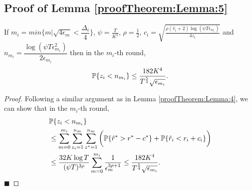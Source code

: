 \subsection{Proof of Lemma \ref{proofTheorem:Lemma:5}}
\label{App:Lemma:5}
\begin{customlem}{5}
If $m_i = min\lbrace m|\sqrt{4\epsilon_{m} } < \dfrac{\Delta_i}{4} \rbrace $, $\psi=\frac{T}{ K^2}$, $\rho=\frac{1}{2}$, $c_{i} =\sqrt{\frac{\rho (\hat{v}_i + 2)\log (\psi T\epsilon_{m_{i}})}{4 z_i}}$ and $n_{m_i}=\dfrac{\log{(\psi T\epsilon_{m_{i}}^{2})}}{2\epsilon_{m_{i}}}$ then in the $m_i$-th round, 
\begin{align*}
\mathbb{P}\lbrace z_i < n_{m_i} \rbrace \leq \dfrac{182 K^4}{T^{\frac{5}{4}}\sqrt{\epsilon_{m_i}}}.
\end{align*}
\end{customlem}

\begin{proof}
Following a similar argument as in Lemma \ref{proofTheorem:Lemma:4}, we can show that in the $m_i$-th round,
\begin{align*}
&\mathbb{P}\lbrace z_i < n_{m_i} \rbrace \\
&\leq \sum_{m=0}^{m_i}\sum_{z_i =1}^{n_{m}}\sum_{z^* =1}^{n_{m}}\bigg(\mathbb{P}\lbrace \hat{r}^* > r^* - c^{*}\rbrace + \mathbb{P}\lbrace \hat{r}_i < r_i + c_i\rbrace\bigg) \\
&\leq \dfrac{32K\log T}{(\psi T)^{3\rho}}\sum_{m=0}^{m_i}\dfrac{1}{\epsilon_{m}^{3\rho + 1}}\leq \dfrac{182 K^4}{T^{\frac{5}{4}}\sqrt{\epsilon_{m_i}}}.
\end{align*}
\hfill $\blacksquare$	
\end{proof}

